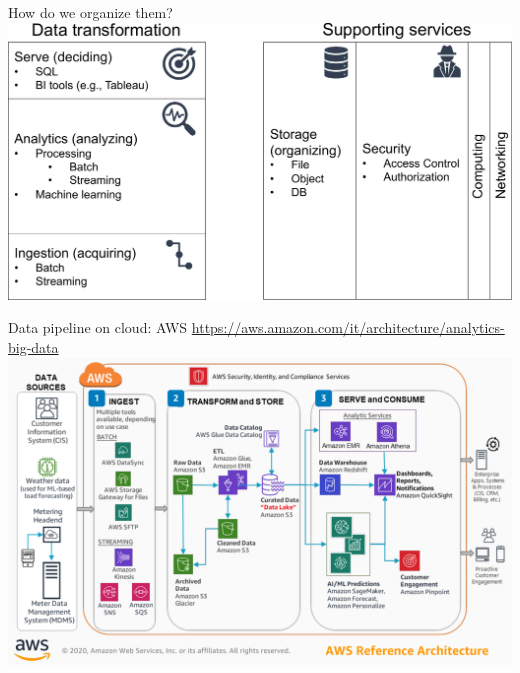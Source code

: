 \begin{frame}{How do we organize them?}
\includegraphics[height=.7\textheight]{imgs/cloudpatchwork.pdf}



\end{frame}


\begin{frame}{Data pipeline on cloud: AWS}
\url{https://aws.amazon.com/it/architecture/analytics-big-data}
\includegraphics[height=.8\textheight]{imgs/awspipeline.png}
\end{frame}

